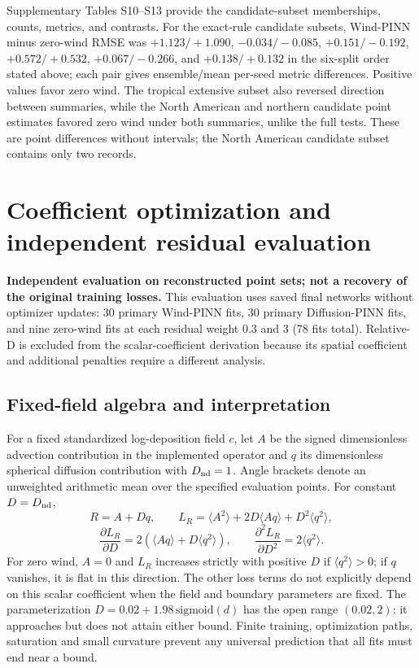 \documentclass[11pt,a4paper]{article}
\begin{document}
Supplementary Tables S10--S13 provide the candidate-subset memberships, counts, metrics, and contrasts. For the exact-rule candidate subsets, Wind-PINN minus zero-wind RMSE was $+1.123/+1.090$, $-0.034/-0.085$, $+0.151/-0.192$, $+0.572/+0.532$, $+0.067/-0.266$, and $+0.138/+0.132$ in the six-split order stated above; each pair gives ensemble/mean per-seed metric differences. Positive values favor zero wind. The tropical extensive subset also reversed direction between summaries, while the North American and northern candidate point estimates favored zero wind under both summaries, unlike the full tests. These are point differences without intervals; the North American candidate subset contains only two records.

\section{Coefficient optimization and independent residual evaluation}
\label{sec:coefficient-evaluation}
\textbf{Independent evaluation on reconstructed point sets; not a recovery of the original training losses.} This evaluation uses saved final networks without optimizer updates: 30 primary Wind-PINN fits, 30 primary Diffusion-PINN fits, and nine zero-wind fits at each residual weight 0.3 and 3 (78 fits total). Relative-D is excluded from the scalar-coefficient derivation because its spatial coefficient and additional penalties require a different analysis.

\subsection*{Fixed-field algebra and interpretation}
For a fixed standardized log-deposition field $c$, let $A$ be the signed dimensionless advection contribution in the implemented operator and $q$ its dimensionless spherical diffusion contribution with $D_{\rm nd}=1$. Angle brackets denote an unweighted arithmetic mean over the specified evaluation points. For constant $D=D_{\rm nd}$,
\[
R=A+Dq,\qquad L_R=\langle A^2\rangle+2D\langle Aq\rangle+D^2\langle q^2\rangle,
\]
\[
\frac{\partial L_R}{\partial D}=2(\langle Aq\rangle+D\langle q^2\rangle),\qquad
\frac{\partial^2 L_R}{\partial D^2}=2\langle q^2\rangle.
\]
For zero wind, $A=0$ and $L_R$ increases strictly with positive $D$ if $\langle q^2\rangle>0$; if $q$ vanishes, it is flat in this direction. The other loss terms do not explicitly depend on this scalar coefficient when the field and boundary parameters are fixed. The parameterization $D=0.02+1.98\,\mathrm{sigmoid}(d)$ has the open range $(0.02,2)$: it approaches but does not attain either bound. Finite training, optimization paths, saturation and small curvature prevent any universal prediction that all fits must end near a bound.
\end{document}
